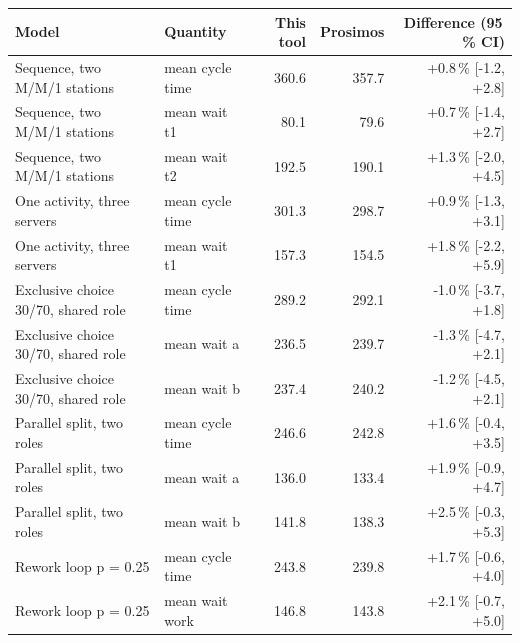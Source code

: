 \begin{tabular}{llrrr}
\toprule
Model & Quantity & This tool & Prosimos & Difference (95\,\% CI) \\
\midrule
Sequence, two M/M/1 stations & mean cycle time & 360.6 & 357.7 & +0.8\,\% [-1.2, +2.8] \\
Sequence, two M/M/1 stations & mean wait t1 & 80.1 & 79.6 & +0.7\,\% [-1.4, +2.7] \\
Sequence, two M/M/1 stations & mean wait t2 & 192.5 & 190.1 & +1.3\,\% [-2.0, +4.5] \\
One activity, three servers & mean cycle time & 301.3 & 298.7 & +0.9\,\% [-1.3, +3.1] \\
One activity, three servers & mean wait t1 & 157.3 & 154.5 & +1.8\,\% [-2.2, +5.9] \\
Exclusive choice 30/70, shared role & mean cycle time & 289.2 & 292.1 & -1.0\,\% [-3.7, +1.8] \\
Exclusive choice 30/70, shared role & mean wait a & 236.5 & 239.7 & -1.3\,\% [-4.7, +2.1] \\
Exclusive choice 30/70, shared role & mean wait b & 237.4 & 240.2 & -1.2\,\% [-4.5, +2.1] \\
Parallel split, two roles & mean cycle time & 246.6 & 242.8 & +1.6\,\% [-0.4, +3.5] \\
Parallel split, two roles & mean wait a & 136.0 & 133.4 & +1.9\,\% [-0.9, +4.7] \\
Parallel split, two roles & mean wait b & 141.8 & 138.3 & +2.5\,\% [-0.3, +5.3] \\
Rework loop p = 0.25 & mean cycle time & 243.8 & 239.8 & +1.7\,\% [-0.6, +4.0] \\
Rework loop p = 0.25 & mean wait work & 146.8 & 143.8 & +2.1\,\% [-0.7, +5.0] \\
\bottomrule
\end{tabular}
